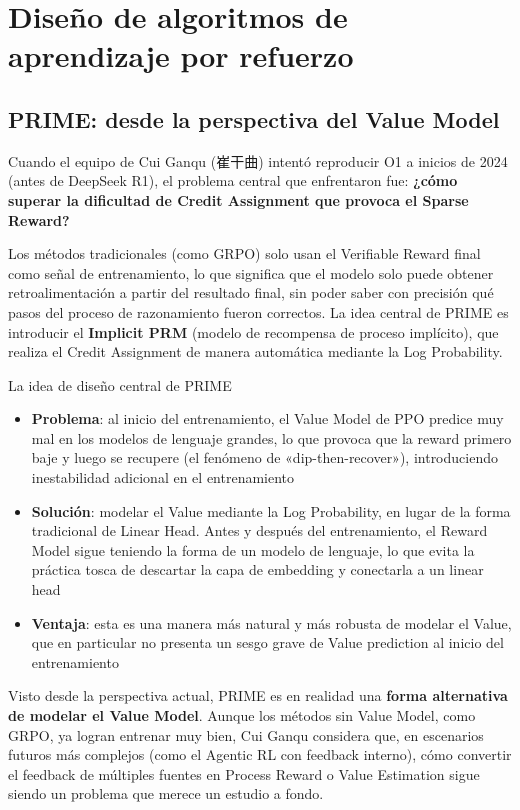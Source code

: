 \section{Diseño de algoritmos de aprendizaje por refuerzo}

\subsection{PRIME: desde la perspectiva del Value Model}

Cuando el equipo de Cui Ganqu (崔干曲) intentó reproducir O1 a inicios de 2024 (antes de DeepSeek R1), el problema central que enfrentaron fue: \textbf{¿cómo superar la dificultad de Credit Assignment que provoca el Sparse Reward?}

Los métodos tradicionales (como GRPO) solo usan el Verifiable Reward final como señal de entrenamiento, lo que significa que el modelo solo puede obtener retroalimentación a partir del resultado final, sin poder saber con precisión qué pasos del proceso de razonamiento fueron correctos. La idea central de PRIME es introducir el \textbf{Implicit PRM} (modelo de recompensa de proceso implícito), que realiza el Credit Assignment de manera automática mediante la Log Probability.

\begin{importantbox}{La idea de diseño central de PRIME}
\begin{itemize}
    \item \textbf{Problema}: al inicio del entrenamiento, el Value Model de PPO predice muy mal en los modelos de lenguaje grandes, lo que provoca que la reward primero baje y luego se recupere (el fenómeno de «dip-then-recover»), introduciendo inestabilidad adicional en el entrenamiento
    \item \textbf{Solución}: modelar el Value mediante la Log Probability, en lugar de la forma tradicional de Linear Head. Antes y después del entrenamiento, el Reward Model sigue teniendo la forma de un modelo de lenguaje, lo que evita la práctica tosca de descartar la capa de embedding y conectarla a un linear head
    \item \textbf{Ventaja}: esta es una manera más natural y más robusta de modelar el Value, que en particular no presenta un sesgo grave de Value prediction al inicio del entrenamiento
\end{itemize}
\end{importantbox}

Visto desde la perspectiva actual, PRIME es en realidad una \textbf{forma alternativa de modelar el Value Model}. Aunque los métodos sin Value Model, como GRPO, ya logran entrenar muy bien, Cui Ganqu considera que, en escenarios futuros más complejos (como el Agentic RL con feedback interno), cómo convertir el feedback de múltiples fuentes en Process Reward o Value Estimation sigue siendo un problema que merece un estudio a fondo.


